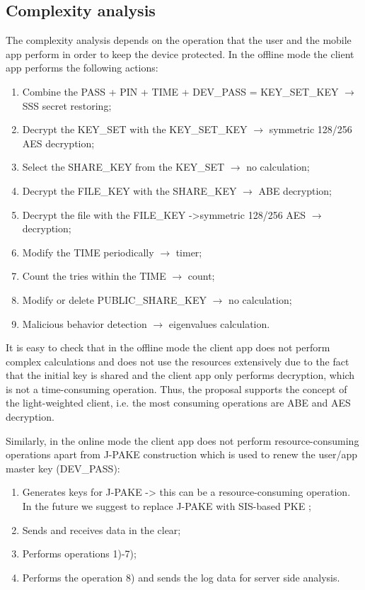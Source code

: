 \documentclass[twocolumn]{svjour3}          	%
\begin{document}
\subsection{Complexity analysis }
\label{sec_complex}

The complexity analysis depends on the operation that the user and the mobile app perform in order to keep the device protected. In the offline mode the client app performs the following actions:

\begin{enumerate}
	\item Combine the PASS + PIN + TIME + DEV\_PASS = KEY\_SET\_KEY $\rightarrow$ SSS secret restoring;
	\item Decrypt the KEY\_SET with the KEY\_SET\_KEY $\rightarrow$ symmetric 128/256 AES decryption;
	\item Select the SHARE\_KEY from the KEY\_SET $\rightarrow$ no calculation;
	\item Decrypt the FILE\_KEY with the SHARE\_KEY $\rightarrow$ ABE decryption;
	\item Decrypt the file with the FILE\_KEY ->symmetric 128/256 AES $\rightarrow$ decryption;
	\item Modify the TIME periodically $\rightarrow$ timer;
	\item Count the tries within the TIME $\rightarrow$ count;
	\item Modify or delete PUBLIC\_SHARE\_KEY $\rightarrow$ no calculation;
	\item Malicious behavior detection $\rightarrow$ eigenvalues calculation.
\end{enumerate}

It is easy to check that in the offline mode the client app does not perform complex calculations and does not use the resources extensively due to the fact that the initial key is shared and the client app only performs decryption, which is not a time-consuming operation. Thus, the proposal supports the concept of the light-weighted client, i.e. the most consuming operations are ABE and AES decryption. 

Similarly, in the online mode the client app does not perform resource-consuming operations apart from J-PAKE construction which is used to renew the user/app master key (DEV\_PASS):

\begin{enumerate}
	\item Generates keys for J-PAKE -> this can be a resource-consuming operation. In the future we suggest to replace J-PAKE with SIS-based PKE \cite{bogos2013primeless,bellovin1992encrypted};
	\item Sends and receives data in the clear;
	\item Performs operations 1)-7);
	\item Performs the operation 8) and sends the log data for server side analysis.
\end{enumerate}
\end{document}
